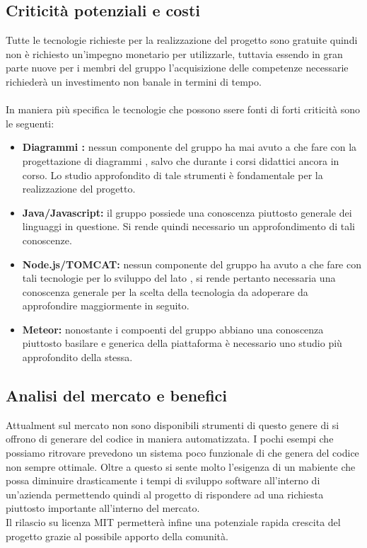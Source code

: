   \subsection{Criticità potenziali e costi}
    Tutte le tecnologie richieste per la realizzazione del progetto sono gratuite quindi non è richiesto
    un'impegno monetario per utilizzarle, tuttavia essendo in gran parte nuove per i membri del gruppo
    l'acquisizione delle competenze necessarie richiederà un investimento non banale in termini di
    tempo.
    \\ \\
    In maniera più specifica le tecnologie che possono ssere fonti di forti criticità sono le seguenti:
      \begin{itemize}
        \item \textbf{Diagrammi :} nessun componente del gruppo ha mai avuto a che fare con la progettazione di diagrammi , salvo che durante i corsi didattici ancora
        in corso. Lo studio approfondito di tale strumenti è fondamentale per la realizzazione del progetto.
        \item \textbf{Java/Javascript:} il gruppo possiede una conoscenza piuttosto generale dei linguaggi in questione. Si rende quindi necessario un approfondimento di tali
        conoscenze.
        \item \textbf{Node.js/TOMCAT:} nessun componente del gruppo ha avuto a che fare con tali tecnologie per lo sviluppo del lato , si rende pertanto necessaria una conoscenza
        generale per la scelta della tecnologia da adoperare da approfondire maggiormente in seguito.
        \item \textbf{Meteor:} nonostante i compoenti del gruppo abbiano una conoscenza piuttosto basilare e generica della piattaforma è necessario uno studio più approfondito della stessa.
      \end{itemize}
  \subsection{Analisi del mercato e benefici}
    Attualment sul mercato non sono disponibili strumenti di questo genere di si offrono di generare del codice in maniera automatizzata. I pochi esempi che possiamo ritrovare
    prevedono un sistema poco funzionale di  che genera del codice non sempre ottimale.
    Oltre a questo si sente molto l'esigenza di un mabiente che possa diminuire drasticamente i tempi di sviluppo software all'interno di un'azienda permettendo quindi al progetto
    di rispondere ad una richiesta piuttosto importante all'interno del mercato. \\
    Il rilascio su licenza MIT permetterà infine una potenziale rapida crescita del progetto grazie al possibile apporto della comunità.

